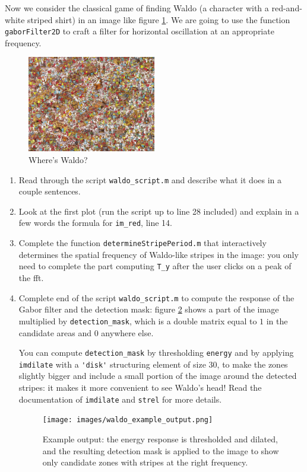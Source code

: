 \begin{enumerate}
  Now we consider the classical game of finding Waldo (a character with a red-and-white striped shirt) in an image like figure \ref{im:waldo}. We are going to use the function \verb!gaborFilter2D! to craft a filter for horizontal oscillation at an appropriate frequency.
  \begin{figure}[ht!]
    \begin{center}
      \includegraphics[width = 0.5\textwidth]{images/waldo.jpg}
    \end{center}
    \caption{\label{im:waldo} Where's Waldo?}
  \end{figure}
  
  \begin{enumerate}
  \item {} Read through the script \verb!waldo_script.m! and describe what it does in a couple sentences.
  \item {} Look at the first plot (run the script up to line 28 included) and explain in a few words the formula for \verb!im_red!, line 14.
  \item {} Complete the function \verb!determineStripePeriod.m! that interactively determines the spatial frequency of Waldo-like stripes in the image: you only need to complete the part computing \verb!T_y! after the user clicks on a peak of the fft.
  \item {} Complete end of the script \verb!waldo_script.m! to compute the response of the Gabor filter and the detection mask: figure \ref{waldo_example} shows a part of the image multiplied by \verb!detection_mask!, which is a double matrix equal to $1$ in the candidate areas and $0$ anywhere else.

    You can compute \verb!detection_mask! by thresholding \verb!energy! and by applying \verb!imdilate! with a \verb!'disk'! structuring element of size $30$, to make the zones slightly bigger and include a small portion of the image around the detected stripes: it makes it more convenient to see Waldo's head! Read the documentation of \verb!imdilate! and \verb!strel! for more details.
    \begin{figure}[ht!]
      \begin{center}
        \texttt{[image: images/waldo\_example\_output.png]}
      \end{center}
      \caption{\label{waldo_example} Example output: the energy response is thresholded and dilated, and the resulting detection mask is applied to the image to show only candidate zones with stripes at the right frequency. }
    \end{figure}
  \end{enumerate}
\end{enumerate}



